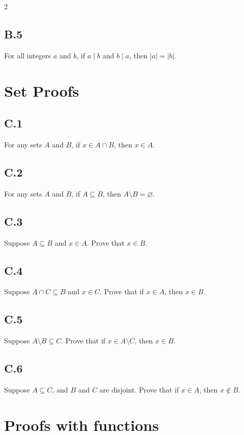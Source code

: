 \documentclass[9pt]{article}
\begin{document}
\begin{multicols}{2}
\subsection*{B.5}  For all integers \( a \) and \( b \), if \( a \mid b \) and \( b \mid a \), then \( |a| = |b| \).

\newpage
\section*{Set Proofs}

\subsection*{C.1}
For any sets \( A \) and \( B \), if \( x \in A \cap B \), then \( x \in A \).

\subsection*{C.2}
For any sets \( A \) and \( B \), if \( A \subseteq B \), then \( A \setminus B = \varnothing \).

\subsection*{C.3}
Suppose \( A \subseteq B \) and \( x \in A \).
Prove that \( x \in B \).

\subsection*{C.4}
Suppose \( A \cap C \subseteq B \) and \( x \in C \).
Prove that if \( x \in A \), then \( x \in B \).

\subsection*{C.5}
Suppose \( A \setminus B \subseteq C \).
Prove that if \( x \in A \setminus C \), then \( x \in B \).

\subsection*{C.6}
Suppose \( A \subseteq C \), and \( B \) and \( C \) are disjoint.
Prove that if \( x \in A \), then \( x \notin B \).

\columnbreak

\section*{Proofs with functions}


\end{multicols}
\end{document}
